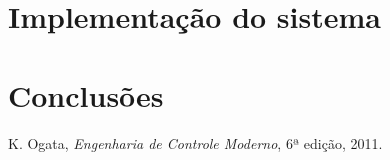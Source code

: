 \documentclass[12pt]{article}
\begin{document}
\section {Implementação do sistema}

\section {Conclusões}


\begin{thebibliography}{5}
	
	 K. Ogata, \emph{Engenharia de Controle Moderno}, 6ª edição, 2011.
	
\end{thebibliography}
\end{document}
